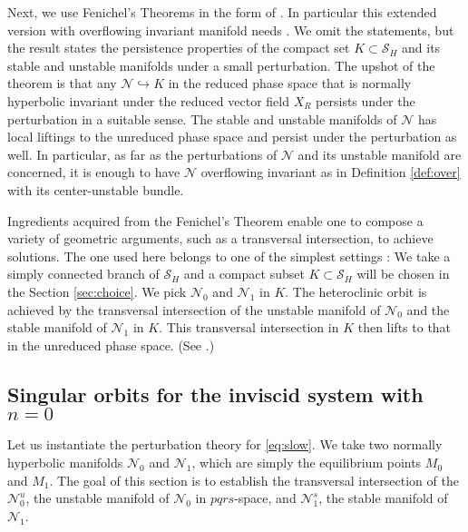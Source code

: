 \documentclass[a4paper,11pt]{article}
\theoremstyle{remark}
\begin{document}
Next, we use Fenichel's Theorems in the form of \cite[Theorem 2.2]{Sz1991}. In particular this extended version with overflowing invariant manifold needs \cite[Theorem 3]{fenichel_asymptotic_1977}. %
We omit the statements, but the result states the persistence properties of the compact set $K\subset\mathcal{S}_H$ and its stable and unstable manifolds under a small perturbation. The upshot of the theorem is that any $\mathcal{N}\hookrightarrow K$ in the reduced phase space that is normally hyperbolic invariant under the reduced vector field $X_R$ persists under the perturbation in a suitable sense. The stable and unstable manifolds of $\mathcal{N}$ has local liftings to the unreduced phase space and persist under the perturbation as well. In particular, as far as the perturbations of $\mathcal{N}$ and its unstable manifold are concerned, it is enough to have $\mathcal{N}$ overflowing invariant as in Definition \ref{def:over} with its center-unstable bundle.

Ingredients acquired from the Fenichel's Theorem enable one to compose a variety of geometric arguments, such as a transversal intersection, to achieve solutions. The one used here belongs to one of the simplest settings \cite[Theorem 3.1]{Sz1991}: We take a simply connected branch of  $\mathcal{S}_H$ and a compact subset $K\subset \mathcal{S}_H$ will be chosen in the Section \ref{sec:choice}. We pick $\mathcal{N}_0$ and $\mathcal{N}_1$ in $K$. The heteroclinic orbit is achieved by the transversal intersection of the unstable manifold of $\mathcal{N}_0$ and the stable manifold of $\mathcal{N}_1$ in $K$. This transversal intersection in $K$ then lifts to that in the unreduced phase space. (See \cite{Sz1991}.) %

\subsection{Singular orbits for the inviscid system with $n=0$}\label{sec:singorb}

Let us instantiate the perturbation theory for \eqref{eq:slow}. We take two normally hyperbolic manifolds %
$\mathcal{N}_0$ and $\mathcal{N}_1$, which are simply the equilibrium points $M_0$ and $M_1$. The goal of this section is to establish the transversal intersection of the $\mathcal{N}_0^u$, the unstable manifold of $\mathcal{N}_0$ in $pqrs$-space, and $\mathcal{N}^s_1$, the stable manifold of $\mathcal{N}_1$.  
\end{document}
